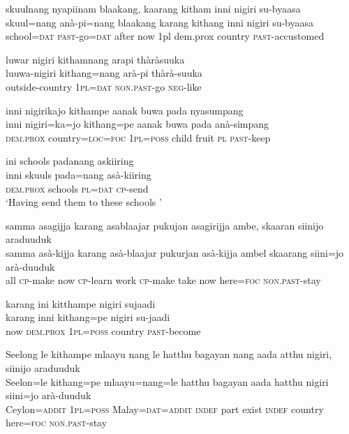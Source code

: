\ea \label{K051222nar04.19}
\glll
skuulnang nyapiinam blaakang, 	kaarang kitham inni nigiri su-byaasa\\
skuul=nang anà-pi=nang blaakang karang kithang inni nigiri su-byaasa\\
school=\textsc{dat} \textsc{past}-go=\textsc{dat} after 	now 	1pl 	dem.prox  country \textsc{past}-accustomed\\
\z


\ea \label{K051222nar04.20}
\glll
 luwar nigiri kithamnang arapi thàràsuuka\\
 luuwa-nigiri kithang=nang arà-pi thàrà-suuka\\
 outside-country \textsc{1pl}=\textsc{dat} \textsc{non.past}-go \textsc{neg}-like\\
\z


\ea \label{K051222nar04.21}
\glll
 inni nigirikajo kithampe aanak buwa pada  nyasumpang\\
 inni nigiri=ka=jo kithang=pe aanak buwa pada anà-simpang \\
 \textsc{dem.prox} country=\textsc{loc}=\textsc{foc} \textsc{1pl}=\textsc{poss} child fruit  \textsc{pl} \textsc{past}-keep\\
\z


\ea \label{K051222nar04.22}
\glll
 ini schools padanang askiiring\\
 inni skuuls pada=nang  asà-kiiring\\
 \textsc{dem.prox} schools \textsc{pl}=\textsc{dat}  \textsc{cp}-send\\
`Having send them to these schools '
\z


\ea \label{K051222nar04.23}
\glll
 samma asagijja karang asablaajar pukujan asagirijja ambe, skaaran siinijo araduuduk\\
 samma asà-kijja karang asà-blaajar pukurjan asà-kijja ambel skaarang siini=jo arà-duuduk\\
 all \textsc{cp}-make now \textsc{cp}-learn work \textsc{cp}-make take now    here=\textsc{foc} \textsc{non.past}-stay\\
\z


\ea \label{K051222nar04.24}
\glll
 karang ini kitthampe nigiri sujaadi\\
 karang inni kithang=pe nigiri su-jaadi\\
 now \textsc{dem.prox} \textsc{1pl}=\textsc{poss} country \textsc{past}-become\\
\z


\ea \label{K051222nar04.25}
\glll
 Seelong le kithampe mlaayu nang le hatthu bagayan nang aada atthu nigiri,    siinijo araduuduk\\
 Seelon=le kithang=pe mlaayu=nang=le hatthu bagayan aada hatthu nigiri siini=jo arà-duuduk\\
 Ceylon=\textsc{addit}  \textsc{1pl}=\textsc{poss} Malay=\textsc{dat}=\textsc{addit} \textsc{indef} part exist \textsc{indef} country here=\textsc{foc} \textsc{non.past}-stay\\
\z

